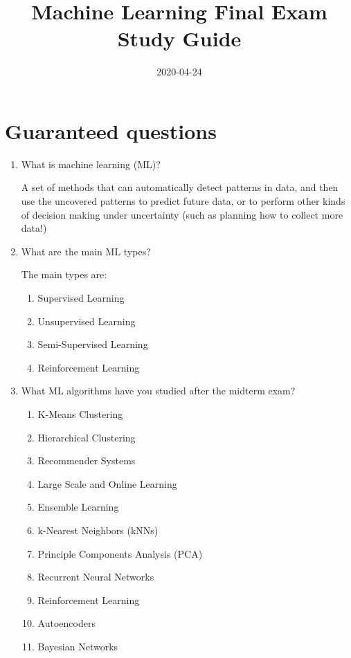 \documentclass[12pt]{article}
\title{Machine Learning Final Exam Study Guide}
\date{2020-04-24}
\newenvironment{QandA}{\begin{enumerate}[label=\bfseries\arabic*.]\bfseries}
{\end{enumerate}}
\newenvironment{answered}{\par\normalfont\color{Sepia}}{}
\begin{document}
\noindent%
  
\section*{Guaranteed questions}
\begin{QandA}
    \item What is machine learning (ML)? 
    \begin{answered} 
        A set of methods that can automatically detect patterns in
        data, and then use the uncovered patterns to predict future
        data, or to perform other kinds of decision making under
        uncertainty (such as planning how to collect more data!)
    \end{answered}

    \item What are the main ML types? 
    \begin{answered} 
        The main types are:
        \begin{enumerate}
            \item Supervised Learning 
            \item Unsupervised Learning
            \item Semi-Supervised Learning
            \item Reinforcement Learning 
        \end{enumerate}
    \end{answered}

    \item What ML algorithms have you studied after the midterm exam?
    \begin{answered} 
        \begin{enumerate}
        \item K-Means Clustering
        \item Hierarchical Clustering
        \item Recommender Systems
        \item Large Scale and Online Learning
        \item Ensemble Learning
        \item k-Nearest Neighbors (kNNs)
        \item Principle Components Analysis (PCA)
        \item Recurrent Neural Networks
        \item Reinforcement Learning
        \item Autoencoders
        \item Bayesian Networks
        \end{enumerate}
    \end{answered}


\end{QandA}
\end{document}
